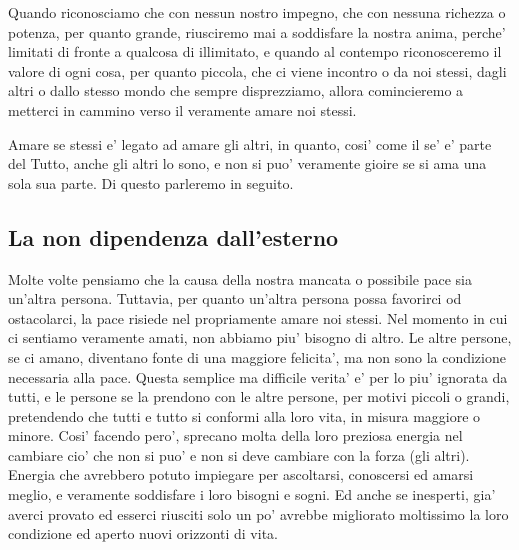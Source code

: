 Quando riconosciamo che con nessun nostro impegno, che con nessuna richezza o potenza, per quanto grande, riusciremo mai a soddisfare la nostra anima, perche' limitati di fronte a qualcosa di illimitato, e quando al contempo riconosceremo il valore di ogni cosa, per quanto piccola, che ci viene incontro o da noi stessi, dagli altri o dallo stesso mondo che sempre disprezziamo, allora comincieremo a metterci in cammino verso il veramente amare noi stessi.

Amare se stessi e' legato ad amare gli altri, in quanto, cosi' come il se' e' parte del Tutto, anche gli altri lo sono, e non si puo' veramente gioire se si ama una sola sua parte. Di questo parleremo in seguito.

\subsection{La non dipendenza dall'esterno}

Molte volte pensiamo che la causa della nostra mancata o possibile pace sia un'altra persona. Tuttavia, per quanto un'altra persona possa favorirci od ostacolarci, la pace risiede nel propriamente amare noi stessi. Nel momento in cui ci sentiamo veramente amati, non abbiamo piu' bisogno di altro. Le altre persone, se ci amano, diventano fonte di una maggiore felicita', ma non sono la condizione necessaria alla pace.
Questa semplice ma difficile verita' e' per lo piu' ignorata da tutti, e le persone se la prendono con le altre persone, per motivi piccoli o grandi, pretendendo che tutti e tutto si conformi alla loro vita, in misura maggiore o minore. Cosi' facendo pero', sprecano molta della loro preziosa energia nel cambiare cio' che non si puo' e non si deve cambiare con la forza (gli altri). Energia che avrebbero potuto impiegare per ascoltarsi, conoscersi ed amarsi meglio, e veramente soddisfare i loro bisogni e sogni. Ed anche se inesperti, gia' averci provato ed esserci riusciti solo un po' avrebbe migliorato moltissimo la loro condizione ed aperto nuovi orizzonti di vita.

